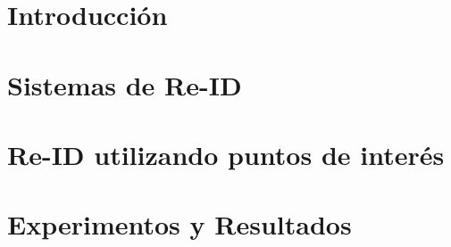 \documentclass[11pt]{report}
\theoremstyle{definition}
\begin{document}
\tableofcontents %
\pagebreak
\listoftables %

\onehalfspace
\chapter{Introducción}


%

\chapter{Sistemas de Re-ID}


\chapter{Re-ID utilizando puntos de interés} %


\chapter{Experimentos y Resultados}


%

%



%
\end{document}
